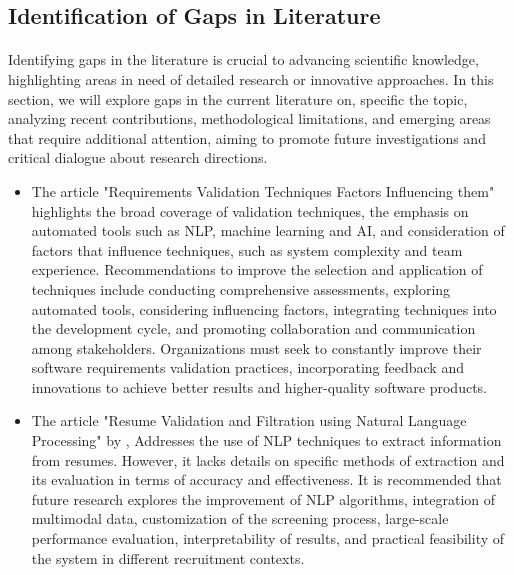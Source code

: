 \subsection{Identification of Gaps in Literature}
\paragraph{}
Identifying gaps in the literature is crucial to advancing scientific knowledge, highlighting areas in need of detailed research or innovative approaches. In this section, we will explore gaps in the current literature on, specific the topic, analyzing recent contributions, methodological limitations, and emerging areas that require additional attention, aiming to promote future investigations and critical dialogue about research directions.
\begin{itemize}
 \item The article "Requirements Validation Techniques Factors Influencing them" \cite{Kumar2023} highlights the broad coverage of validation techniques, the emphasis on automated tools such as NLP, machine learning and AI, and consideration of factors that influence techniques, such as system complexity and team experience.
 Recommendations to improve the selection and application of techniques include conducting comprehensive assessments, exploring automated tools, considering influencing factors, integrating techniques into the development cycle, and promoting collaboration and communication among stakeholders. Organizations must seek to constantly improve their software requirements validation practices, incorporating feedback and innovations to achieve better results and higher-quality software products.
 \item The article "Resume Validation and Filtration using Natural Language Processing" by \cite{Alamelu2021}, Addresses the use of NLP techniques to extract information from resumes. However, it lacks details on specific methods of extraction and its evaluation in terms of accuracy and effectiveness.
 It is recommended that future research explores the improvement of NLP algorithms, integration of multimodal data, customization of the screening process, large-scale performance evaluation, interpretability of results, and practical feasibility of the system in different recruitment contexts.


\end{itemize}
